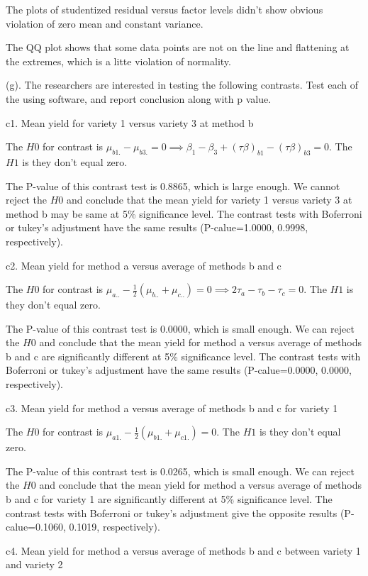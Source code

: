 \documentclass[]{article}
\begin{document}
The plots of studentized residual versus factor levels didn't show
obvious violation of zero mean and constant variance.

The QQ plot shows that some data points are not on the line and
flattening at the extremes, which is a litte violation of normality.

(g).
\textcolor[rgb]{0.5,0.5,0.5}{The researchers are interested in testing the following contrasts. Test each of the using software, and report conclusion along with p value.}

c1. Mean yield for variety 1 versus variety 3 at method b

The \(H0\) for contrast is
\(\mu_{b1.}-\mu_{b3.}=0\implies\beta_{1}-\beta_{3}+(\tau\beta)_{b1}-(\tau\beta)_{b3}=0\).
The \(H1\) is they don't equal zero.

The P-value of this contrast test is 0.8865, which is large enough. We
cannot reject the \(H0\) and conclude that the mean yield for variety 1
versus variety 3 at method b may be same at 5\% significance level. The
contrast tests with Boferroni or tukey's adjustment have the same
results (P-calue=1.0000, 0.9998, respectively).

c2. Mean yield for method a versus average of methods b and c

The \(H0\) for contrast is
\(\mu_{a..}-\frac12(\mu_{b..}+\mu_{c..})=0\implies2\tau_a-\tau_b-\tau_c=0\).
The \(H1\) is they don't equal zero.

The P-value of this contrast test is 0.0000, which is small enough. We
can reject the \(H0\) and conclude that the mean yield for method a
versus average of methods b and c are significantly different at 5\%
significance level. The contrast tests with Boferroni or tukey's
adjustment have the same results (P-calue=0.0000, 0.0000, respectively).

c3. Mean yield for method a versus average of methods b and c for
variety 1

The \(H0\) for contrast is \(\mu_{a1.}-\frac12(\mu_{b1.}+\mu_{c1.})=0\).
The \(H1\) is they don't equal zero.

The P-value of this contrast test is 0.0265, which is small enough. We
can reject the \(H0\) and conclude that the mean yield for method a
versus average of methods b and c for variety 1 are significantly
different at 5\% significance level. The contrast tests with Boferroni
or tukey's adjustment give the opposite results (P-calue=0.1060, 0.1019,
respectively).

c4. Mean yield for method a versus average of methods b and c between
variety 1 and variety 2
\end{document}
